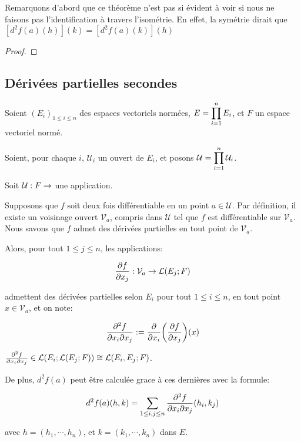 Remarquons d'abord que ce théorème n'est pas si évident à voir si nous ne
faisons pas l'identification à travers l'isométrie. En effet, la symétrie dirait
que $[d^{2}f(a)(h)](k) = [d^{2}f(a)(k)](h)$

\ifdefined\outputproof
\begin{proof}

\end{proof}
\fi

\subsection{Dérivées partielles secondes}

Soient $(E_{i})_{1 \leq i \leq n}$ des espaces vectoriels normées, $E =
\displaystyle \prod_{i = 1}^{n} E_{i}$, et $F$ un espace vectoriel normé.

Soient, pour chaque $i$, $\mathcal{U}_{i}$ un ouvert de $E_{i}$, et posons
$\mathcal{U} = \displaystyle \prod_{i = 1}^{n} \mathcal{U}_{i}$.

Soit $\GSfunction{\mathcal{U}}{F}$ une application.

\begin{proposition}
	Supposons que $f$ soit deux fois différentiable en un point $a \in
	\mathcal{U}$. Par définition, il existe un voisinage ouvert
	$\mathcal{V}_{a}$, compris dans $\mathcal{U}$ tel que $f$ est
	différentiable sur $\mathcal{V}_{a}$.
	Nous savons que $f$ admet des dérivées partielles en tout point de $\mathcal{V}_{a}$.

	Alors, pour tout $1 \leq j \leq n$, les applications:

	\begin{equation}
		\pdv{f}{x_{j}} : \mathcal{V}_{a} \rightarrow \mathcal{L}(E_{j}; F)
	\end{equation}

	admettent des dérivées partielles selon $E_{i}$ pour tout $1 \leq i \leq n$,
	en tout point $x \in \mathcal{V}_{a}$, et on note:

	\begin{equation}
		\pdv{f}{x_{i}}{x_{j}} (x) := \pdv{x_{i}}(\pdv{f}{x_{j}}) (x)
	\end{equation}

	$\pdv{f}{x_{i}}{x_{j}} \in
	\mathcal{L}(E_{i}; \mathcal{L}(E_{j}; F)) \cong
	\mathcal{L}(E_{i}, E_{j}; F)$.

	De plus, $d^{2}f(a)$ peut être calculée grace à ces dernières avec la
	formule:

	\begin{equation}
		d^{2}f(a)(h, k) = \displaystyle \sum_{1 \leq i, j \leq n}
		\pdv{f}{x_{i}}{x_{j}} (a) (h_{i}, k_{j})
	\end{equation}

	avec $h = (h_{1}, \cdots, h_{n})$, et $k = (k_{1}, \cdots, k_{n})$ dans $E$.

\end{proposition}

